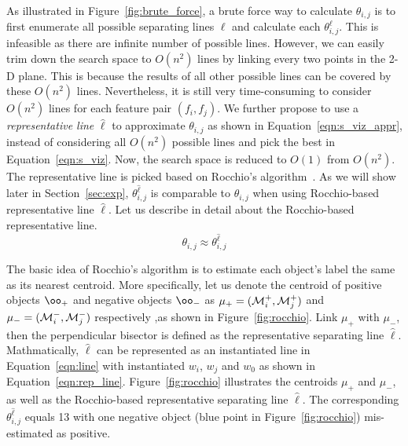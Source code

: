  As illustrated in Figure~\ref{fig:brute_force}, a brute force way to calculate $\theta_{i,j}$ is to first enumerate all possible separating lines $\ell$ and calculate each $\theta_{i,j}^\ell$. This is infeasible as there are infinite number of possible lines. However, we can easily trim down the search space to $O(n^2)$ lines by linking every two points in the 2-D plane. This is because the results of all other possible lines can be covered by these $O(n^2)$ lines. Nevertheless, it is still very time-consuming to consider $O(n^2)$ lines for each feature pair $(f_i,f_j)$. We further propose to use a {\em representative line} $\hat{\ell}$ to approximate $\theta_{i, j}$ as shown in Equation~\ref{eqn:s_viz_appr}, instead of considering all $O(n^2)$ possible lines and pick the best in Equation~\ref{eqn:s_viz}. Now, the search space is reduced to $O(1)$ from $O(n^2)$. The representative line is picked based on Rocchio's algorithm~\cite{rocchio1971relevance}. As we will show later in Section~\ref{sec:exp}, $\theta_{i,j}^{\hat{\ell}}$ is comparable to $\theta_{i,j}$ when using Rocchio-based representative line $\hat{\ell}$. Let us describe in detail about the Rocchio-based representative line.
\begin{equation}\label{eqn:s_viz_appr}
\theta_{i,j}  \approx \theta_{i,j}^{\hat{\ell}}
\end{equation}

 The basic idea of Rocchio's algorithm is to estimate each object's label the same as its nearest centroid. More specifically, let us denote the centroid of positive objects $\oo_+$ and negative objects $\oo_-$ as $\mu_+=(\mm_i^+,\mm_j^+)$ and $\mu_-=(\mm_i^-,\mm_j^-)$ respectively ,as shown in Figure~\ref{fig:rocchio}. Link $\mu_+$ with $\mu_-$, then the perpendicular bisector is defined as the representative separating line $\hat{\ell}$. Mathmatically, $\hat{\ell}$ can be represented as an instantiated line in Equation~\ref{eqn:line} with instantiated $w_i$, $w_j$ and $w_0$ as shown in Equation~\ref{eqn:rep_line}. Figure~\ref{fig:rocchio} illustrates the centroids $\mu_+$ and $\mu_-$, as well as the Rocchio-based representative separating line $\hat{\ell}$. The corresponding $\theta_{i,j}^{\hat{\ell}}$ equals 13 with one negative object (blue point in Figure~\ref{fig:rocchio}) mis-estimated as positive.




